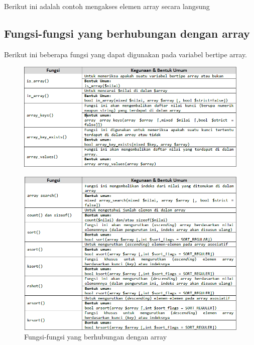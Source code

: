 Berikut ini adalah contoh mengakses elemen array secara langsung


\subsection{Fungsi-fungsi yang berhubungan dengan array}
Berikut ini beberapa fungsi yang dapat digunakan pada variabel bertipe array.
\begin{figure}[!htbp]
 \centering
 \includegraphics[width=.90\textwidth]{figures/fungsi_array.png}
\end{figure}

\begin{figure}[!htbp]
 \centering
\includegraphics[width=.90\textwidth]{figures/fungsi_array2.png}
 \caption{Fungsi-fungsi yang berhubungan dengan array}\label{fig:inputchapter}
\end{figure}


